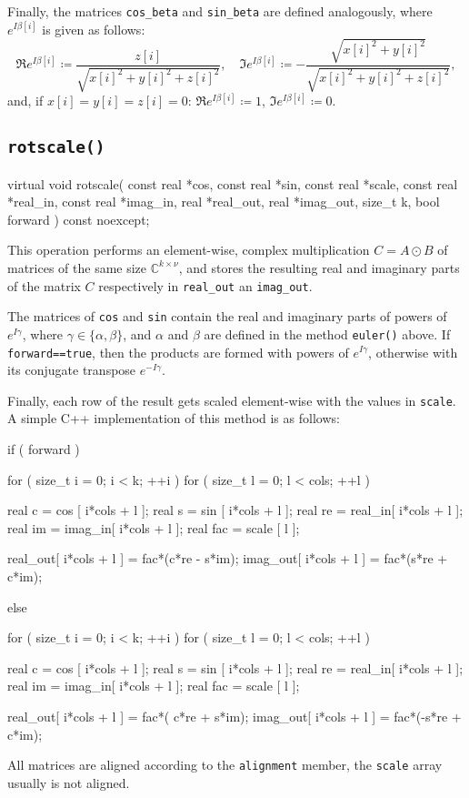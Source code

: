 \documentclass{scrbook}
\newcommand{\complex}{\mathbb{C}}
\begin{document}
Finally, the matrices \lstinline|cos_beta| and \lstinline|sin_beta| are defined
analogously, where $e^{I\beta[i]}$ is given as follows:
\begin{equation*}
\Re e^{I\beta[i]} \coloneqq  \frac{z[i]}{\sqrt{x[i]^2+y[i]^2+z[i]^2}},\quad
\Im e^{I\beta[i]} \coloneqq
-\frac{\sqrt{x[i]^2+y[i]^2}}{\sqrt{x[i]^2+y[i]^2+z[i]^2}},
\end{equation*}
and, if $x[i]=y[i]=z[i]=0$: $\Re e^{I\beta[i]}\coloneqq 1$,
$\Im e^{I\beta[i]}\coloneqq 0$.


\subsection{\texorpdfstring{\lstinline|rotscale()|}{rotscale}}
\begin{cppcode*}
virtual void rotscale( const real *cos,      const real *sin, const real *scale,
                       const real *real_in,  const real *imag_in,
                             real *real_out,       real *imag_out,
                       size_t k, bool forward ) const noexcept;
\end{cppcode*}

This operation performs an element-wise, complex multiplication $C=A\odot B$ of
matrices of the same size $\complex^{k\times\nu}$, and stores the resulting
real and imaginary parts of the matrix $C$ respectively in \lstinline|real_out|
an \lstinline|imag_out|.

The matrices of \lstinline|cos| and \lstinline|sin| contain the real and
imaginary parts of powers of $e^{I\gamma}$, where
$\gamma\in\lbrace\alpha,\beta\rbrace$, and $\alpha$ and $\beta$ are defined
in the method \lstinline|euler()| above. If \lstinline|forward==true|, then
the products are formed with powers of $e^{I\gamma}$, otherwise with its
conjugate transpose $e^{-I\gamma}$.

Finally, each row of the result gets scaled element-wise with the values
in \lstinline|scale|. A simple C++ implementation of this method is as follows:
\begin{cppcode*}
if ( forward )
{
    for ( size_t i = 0; i < k;    ++i )
    for ( size_t l = 0; l < cols; ++l )
    {
        real c   = cos    [ i*cols + l ];
        real s   = sin    [ i*cols + l ];
        real re  = real_in[ i*cols + l ];
        real im  = imag_in[ i*cols + l ];
        real fac = scale  [          l ];
        
        real_out[ i*cols + l ] = fac*(c*re - s*im);
        imag_out[ i*cols + l ] = fac*(s*re + c*im);
    }
}
else
{
    for ( size_t i = 0; i < k;    ++i )
    for ( size_t l = 0; l < cols; ++l )
    {
        real c   = cos    [ i*cols + l ];
        real s   = sin    [ i*cols + l ];
        real re  = real_in[ i*cols + l ];
        real im  = imag_in[ i*cols + l ];
        real fac = scale  [          l ];
        
        real_out[ i*cols + l ] = fac*( c*re + s*im);
        imag_out[ i*cols + l ] = fac*(-s*re + c*im);
    }
}
\end{cppcode*}
All matrices are aligned according to the \lstinline|alignment| member,
the \lstinline|scale| array usually is not aligned.
\end{document}
